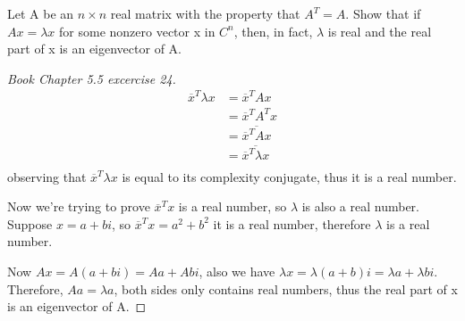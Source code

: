 \begin{problem}\label{e24}
    Let A be an \(n \times n\) real matrix with the property that \(A^T = A\). Show that if \(Ax = \lambda x\) for some nonzero vector x in \(C^n\), then, in fact, \(\lambda\) is real and the real part of x is an eigenvector of A.    
\end{problem}
\begin{proof}[Book Chapter 5.5 excercise 24]
    \begin{align*}
        \overline{x}^T \lambda x &=  \overline{x}^T Ax \\
            &= \overline{x}^T A^T x \tag{A is symmetric}\\
            &= \overline{\overline{x}^T Ax} \tag{excercise 23}\\
            &= \overline{\overline{x}^T \lambda x}\\
    \end{align*}
    observing that \(\overline{x}^T \lambda x\) is equal to its complexity conjugate, thus it is a real number.

    Now we're trying to prove \(\overline{x}^T x\) is a real number, so \(\lambda\) is also a real number. \\ 
    Suppose \(x = a + b i\), so \(\overline{x}^T x = a^2 + b^2\) it is a real number, therefore \(\lambda\) is a real number. 
    
    Now \(Ax = A(a + bi) = Aa + Ab i\), also we have \(\lambda x = \lambda (a + b) i = \lambda a + \lambda b i\).\\  
    Therefore, \(Aa = \lambda a\), both sides only contains real numbers, thus the real part of x is an eigenvector of A.
\end{proof}